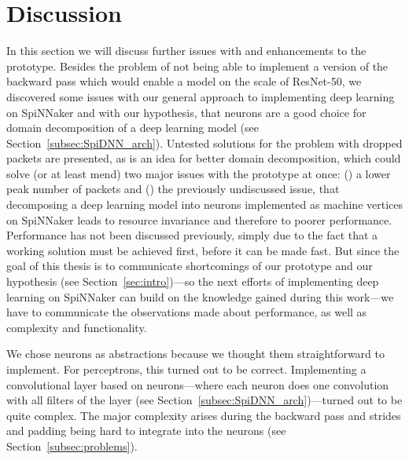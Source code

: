 \documentclass[]{article}
\begin{document}



\section{Discussion} %
\label{sec:discussion}

In this section we will discuss further issues with and enhancements
to the prototype.
Besides the problem of not being able to implement a version of the
backward pass which would enable a model on the scale of ResNet-50,
we discovered some issues with our general approach to implementing
deep learning on SpiNNaker and with our hypothesis, that neurons
are a good choice for domain decomposition of a deep learning model
(see Section~\ref{subsec:SpiDNN_arch}).
Untested solutions for the problem with dropped packets are presented,
as is an idea for better domain decomposition, which could solve (or
at least mend) two major issues with the prototype at once:
() a lower peak number of packets and ()
the previously undiscussed issue, that decomposing a deep learning
model into neurons implemented as machine vertices on SpiNNaker leads
to resource invariance and therefore to poorer performance.
Performance has not been discussed previously, simply due to the
fact that a working solution must be achieved first, before it can
be made fast.
But since the goal of this thesis is to communicate shortcomings of
our prototype and our hypothesis (see Section~\ref{sec:intro})---so
the next efforts of implementing deep learning on SpiNNaker can build
on the knowledge gained during this work---we have to communicate the
observations made about performance, as well as complexity and
functionality.

We chose neurons as abstractions because we thought them
straightforward to implement.
For perceptrons, this turned out to be correct.
Implementing a convolutional layer based on neurons---where each
neuron does one convolution with all filters of the layer
(see Section~\ref{subsec:SpiDNN_arch})---turned out to be quite
complex.
The major complexity arises during the backward pass and strides and
padding being hard to integrate into the neurons (see
Section~\ref{subsec:problems}).
\end{document}
